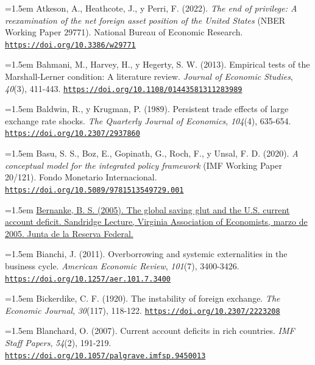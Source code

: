 \documentclass[10pt,a4paper]{article}
\begin{document}
\noindent\hangindent=1.5em Atkeson, A., Heathcote, J., y Perri, F. (2022). \textit{The end of privilege: A reexamination of the net foreign asset position of the United States} (NBER Working Paper 29771). National Bureau of Economic Research. \href{https://doi.org/10.3386/w29771}{\nolinkurl{https://doi.org/10.3386/w29771}}

\noindent\hangindent=1.5em Bahmani, M., Harvey, H., y Hegerty, S. W. (2013). Empirical tests of the Marshall-Lerner condition: A literature review. \textit{Journal of Economic Studies}, \textit{40}(3), 411-443. \href{https://doi.org/10.1108/01443581311283989}{\nolinkurl{https://doi.org/10.1108/01443581311283989}}

\noindent\hangindent=1.5em Baldwin, R., y Krugman, P. (1989). Persistent trade effects of large exchange rate shocks. \textit{The Quarterly Journal of Economics}, \textit{104}(4), 635-654. \href{https://doi.org/10.2307/2937860}{\nolinkurl{https://doi.org/10.2307/2937860}}

\noindent\hangindent=1.5em Basu, S. S., Boz, E., Gopinath, G., Roch, F., y Unsal, F. D. (2020). \textit{A conceptual model for the integrated policy framework} (IMF Working Paper 20/121). Fondo Monetario Internacional. \href{https://doi.org/10.5089/9781513549729.001}{\nolinkurl{https://doi.org/10.5089/9781513549729.001}}

\noindent\hangindent=1.5em \href{https://www.federalreserve.gov/boarddocs/speeches/2005/200503102/}{Bernanke, B. S. (2005). The global saving glut and the U.S. current account deficit. Sandridge Lecture, Virginia Association of Economists, marzo de 2005. Junta de la Reserva Federal.}

\noindent\hangindent=1.5em Bianchi, J. (2011). Overborrowing and systemic externalities in the business cycle. \textit{American Economic Review}, \textit{101}(7), 3400-3426. \href{https://doi.org/10.1257/aer.101.7.3400}{\nolinkurl{https://doi.org/10.1257/aer.101.7.3400}}

\noindent\hangindent=1.5em Bickerdike, C. F. (1920). The instability of foreign exchange. \textit{The Economic Journal}, \textit{30}(117), 118-122. \href{https://doi.org/10.2307/2223208}{\nolinkurl{https://doi.org/10.2307/2223208}}

\noindent\hangindent=1.5em Blanchard, O. (2007). Current account deficits in rich countries. \textit{IMF Staff Papers}, \textit{54}(2), 191-219. \href{https://doi.org/10.1057/palgrave.imfsp.9450013}{\nolinkurl{https://doi.org/10.1057/palgrave.imfsp.9450013}}
\end{document}

